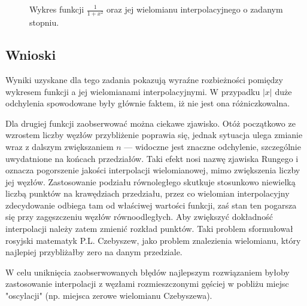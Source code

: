 \documentclass{classrep}
\begin{document}
		
		\begin{figure}[!h]
			\centering
			 \hfill
			 \hfill
  			\caption{Wykres funkcji $\frac{1}{1+x^2}$ oraz jej wielomianu interpolacyjnego o zadanym stopniu.}
  			\label{fig:4}
		\end{figure}	
	\subsection{Wnioski}	
		Wyniki uzyskane dla tego zadania pokazują wyraźne rozbieżności pomiędzy wykresem funkcji a jej wielomianami interpolacyjnymi.
		W przypadku $|x|$ duże odchylenia spowodowane były głównie faktem, iż nie jest ona różniczkowalna.
		
		Dla drugiej funkcji zaobserwować można ciekawe zjawisko. Otóż początkowo ze wzrostem liczby węzłów przybliżenie poprawia się, jednak sytuacja ulega zmianie wraz z dalszym zwiększaniem $n$ --- widoczne jest znaczne odchylenie, szczególnie uwydatnione na końcach przedziałów. Taki efekt nosi nazwę zjawiska Rungego i oznacza pogorszenie jakości interpolacji wielomianowej, mimo zwiększenia liczby jej węzłów.
		Zastosowanie podziału równoległego skutkuje stosunkowo niewielką liczbą punktów na krawędziach przedziału, przez co wielomian interpolacyjny zdecydowanie odbiega tam od właściwej wartości funkcji, zaś stan ten pogarsza się przy zagęszczeniu węzłów równoodległych.
		Aby zwiększyć dokładność interpolacji należy zatem zmienić rozkład punktów. Taki problem sformułował rosyjski matematyk P.L. Czebyszew, jako problem znalezienia wielomianu, który najlepiej przybliżałby zero na danym przedziale. 
		
		W celu uniknięcia zaobserwowanych błędów najlepszym rozwiązaniem byłoby zastosowanie interpolacji z węzłami rozmieszczonymi gęściej w pobliżu miejsc "oscylacji" (np. miejsca zerowe wielomianu Czebyszewa).
		
\end{document}
